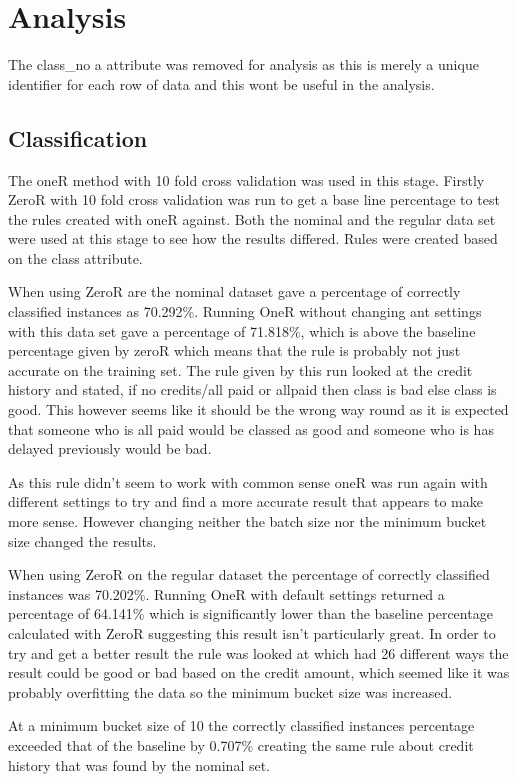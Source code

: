 \documentclass[12pt, a4paper]{article}
\begin{document}
	\section{Analysis}
	The class\_no a attribute was removed for analysis as this is merely a unique identifier for each row of data and this wont be useful in the analysis.
	
	\subsection{Classification}
	The oneR method with 10 fold cross validation was used in this stage. Firstly ZeroR with 10 fold cross validation was run to get a base line percentage to test the rules created with oneR against. Both the nominal and the regular data set were used at this stage to see how the results differed. Rules were created based on the class attribute.
	
	When using ZeroR are the nominal dataset gave a percentage of correctly classified instances as 70.292\%. Running OneR without changing ant settings with this data set gave a percentage of 71.818\%, which is above the baseline percentage given by zeroR which means that the rule is probably not just accurate on the training set. The rule given by this run looked at the credit history and stated, if no credits/all paid or allpaid then class is bad else class is good. This however seems like it should be the wrong way round as it is expected that someone who is all paid would be classed as good and someone who is has delayed previously would be bad.
	
	As this rule didn't seem to work with common sense oneR was run again with different settings to try and find a more accurate result that appears to make more sense. However changing neither the batch size nor the minimum bucket size changed the results.
	
	When using ZeroR on the regular dataset the percentage of correctly classified instances was 70.202\%. Running OneR with default settings returned a percentage of 64.141\% which is significantly lower than the baseline percentage calculated with ZeroR suggesting this result isn't particularly great. In order to try and get a better result the rule was looked at which had 26 different ways the result could be good or bad based on the credit amount, which seemed like it was probably overfitting the data so the minimum bucket size was increased.
	
	At a minimum bucket size of 10 the correctly classified instances percentage exceeded that of the baseline by 0.707\% creating the same rule about credit history that was found by the nominal set. 
	
\end{document}
